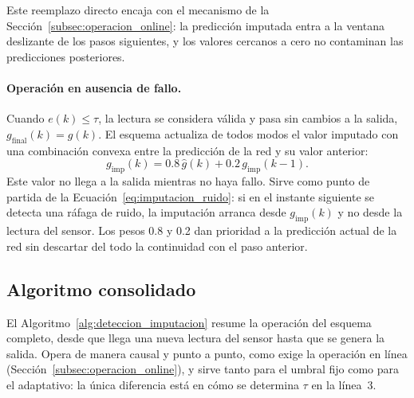 \documentclass{report}
\begin{document}
Este reemplazo directo encaja con el mecanismo de la Sección~\ref{subsec:operacion_online}: la predicción imputada entra a la ventana deslizante de los pasos siguientes, y los valores cercanos a cero no contaminan las predicciones posteriores.

\paragraph{Operación en ausencia de fallo.} Cuando $e(k) \leq \tau$, la lectura se considera válida y pasa sin cambios a la salida, $g_{\mathrm{final}}(k) = g(k)$. El esquema actualiza de todos modos el valor imputado con una combinación convexa entre la predicción de la red y su valor anterior:
\begin{equation}
\label{eq:imputacion_no_fallo}
g_{\mathrm{imp}}(k) = 0.8\,\hat{g}(k) + 0.2\,g_{\mathrm{imp}}(k\!-\!1).
\end{equation}
Este valor no llega a la salida mientras no haya fallo. Sirve como punto de partida de la Ecuación~\eqref{eq:imputacion_ruido}: si en el instante siguiente se detecta una ráfaga de ruido, la imputación arranca desde $g_{\mathrm{imp}}(k)$ y no desde la lectura del sensor. Los pesos 0.8 y 0.2 dan prioridad a la predicción actual de la red sin descartar del todo la continuidad con el paso anterior.

\subsection*{Algoritmo consolidado}
\label{subsec:algoritmo_general}

El Algoritmo~\ref{alg:deteccion_imputacion} resume la operación del esquema completo, desde que llega una nueva lectura del sensor hasta que se genera la salida. Opera de manera causal y punto a punto, como exige la operación en línea (Sección~\ref{subsec:operacion_online}), y sirve tanto para el umbral fijo como para el adaptativo: la única diferencia está en cómo se determina $\tau$ en la línea~3.
\end{document}
